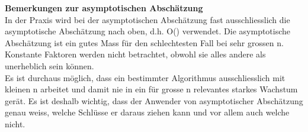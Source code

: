 \textbf{Bemerkungen zur asymptotischen Abschätzung}\\
In der Praxis wird bei der asymptotischen Abschätzung fast ausschliesslich die asymptotische Abschätzung nach
oben, d.h. O() verwendet. Die asymptotische Abschätzung ist ein gutes Mass für den schlechtesten Fall bei sehr
grossen n. Konstante Faktoren werden nicht betrachtet, obwohl sie alles andere als unerheblich sein können.\\
Es ist durchaus möglich, dass ein bestimmter Algorithmus ausschliesslich mit kleinen n arbeitet und damit nie in ein
für grosse n relevantes starkes Wachstum gerät. Es ist deshalb wichtig, dass der Anwender von asymptotischer Abschätzung
genau weiss, welche Schlüsse er daraus ziehen kann und vor allem auch welche nicht.\\


